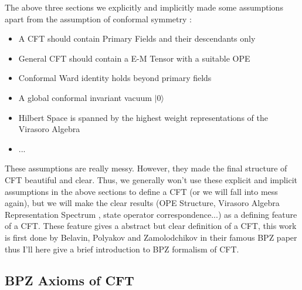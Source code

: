 
The above three sections we explicitly and implicitly made some assumptions apart from the assumption of conformal symmetry :
\begin{itemize}
  \item A CFT should contain Primary Fields and their descendants only
  \item General CFT should contain a E-M Tensor with a suitable OPE
  \item Conformal Ward identity holds beyond primary fields
  \item A global conformal invariant vacuum $ |0\rangle $ 
  \item Hilbert Space is spanned by the highest weight representations of the Virasoro Algebra
  \item ...
\end{itemize}
These assumptions are really messy. However, they made the final structure of CFT beautiful and clear. Thus, we generally won't use these explicit and implicit assumptions in the above sections to define a CFT (or we will fall into mess again), but we will make the clear results (OPE Structure, Virasoro Algebra Representation Spectrum , state operator correspondence...) as a defining feature of a CFT. These feature gives a abstract but clear definition of a CFT, this work is first done by Belavin, Polyakov and Zamolodchikov in their famous BPZ paper thus I'll here give a brief introduction to BPZ formalism of CFT. 

\subsection{BPZ Axioms of CFT}




\subsection{}




